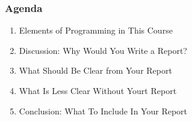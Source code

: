 \begin{frame}

\frametitle{Agenda}

\begin{enumerate}

\item Elements of Programming in This Course

\item Discussion: Why Would You Write a Report?

\item What Should Be Clear from Your Report

\item What Is Less Clear Without Yourt Report

\item Conclusion: What To Include In Your Report

\end{enumerate}

\end{frame}
